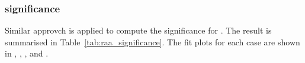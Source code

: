 
%


\subsubsection{\raa significance}
Similar approvch is applied to compute the significance for \raa. The result is summarised in Table~\ref{tab:raa_significance}. The fit plots for each case are shown in , , , and .

